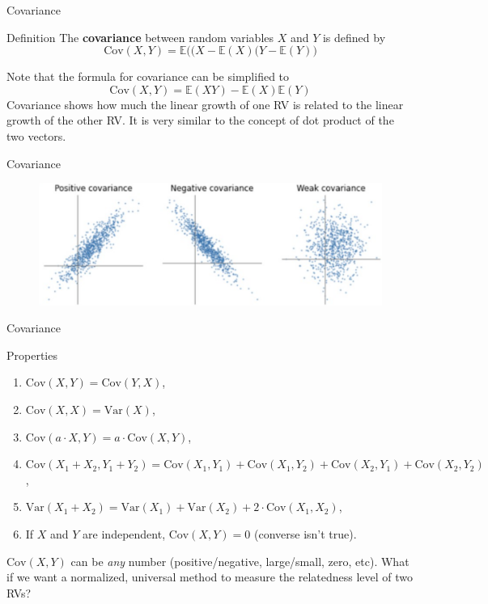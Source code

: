 \documentclass{beamer}
\newcommand{\E}{\mathbb{E}}
\newcommand{\Cov}{\text{Cov}}
\begin{document}
		\begin{frame}{Covariance}
				\begin{block}{Definition}
						The \textbf{covariance} between random variables \( X \) and \( Y \) is defined by
						\[ \text{Cov}(X, Y) = \E\big((X - \E(X)(Y - \E(Y)\big) \]
						
					\end{block}\pause
				Note that the formula for covariance can be simplified to
				\[ \Cov(X, Y) = \E(XY) - \E(X)\E(Y) \]
%				
				\pause Covariance shows how much the linear growth of one RV is related to the linear growth of the other RV. It is very similar to the concept of dot product of the two vectors.
				
			\end{frame}
	
	\begin{frame}{Covariance}
		\begin{figure}
			\centering
			\includegraphics[width=0.9\linewidth]{screenshot001}
		\end{figure}
		
	\end{frame}
	
	
	\begin{frame}{Covariance}
		\begin{block}{Properties}
			\begin{enumerate}[<+->]
				\item \( \text{Cov}(X, Y) = \text{Cov}(Y, X) \),
				\item \( \text{Cov}(X, X) = \text{Var}(X) \),
				\item  \( \text{Cov}(a \cdot X, Y) = a \cdot \text{Cov}(X, Y) \),
				\item  \(\displaystyle \text{Cov}\left( X_1+X_2, Y_1+Y_2\right) = \text{Cov}(X_1, Y_1) +\text{Cov}(X_1, Y_2) +\text{Cov}(X_2, Y_1) +\text{Cov}(X_2, Y_2) \),
				\item  \(\displaystyle \text{Var}\left(X_1+X_2\right) = \text{Var}(X_1)+\text{Var}(X_2)+2\cdot \text{Cov}(X_1, X_2) \),
				\item If $X$ and $Y$ are independent, $\text{Cov}(X, Y)=0$ (converse isn't true).
				
			\end{enumerate}
		\end{block}
		\pause 
		$\text{Cov}(X, Y)$ can be \textit{any} number (positive/negative, large/small, zero, etc). What if we want a normalized, universal method to measure the relatedness level of two RVs?
		
	\end{frame}
	
\end{document}
